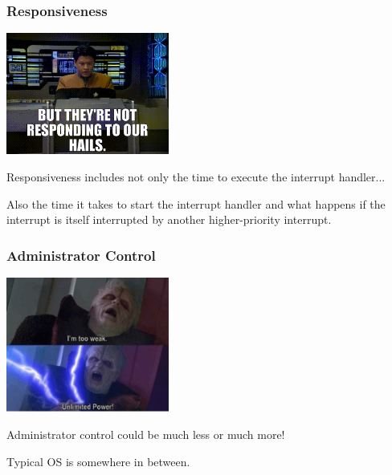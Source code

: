 \begin{frame}
\frametitle{Responsiveness}

\begin{center}
	\includegraphics[width=0.4\textwidth]{images/notresponding.jpg}
\end{center}

Responsiveness includes not only the time to execute the interrupt handler...

Also the time it takes to start the interrupt handler and what happens if the interrupt is itself interrupted by another higher-priority interrupt.

\end{frame}

\begin{frame}
\frametitle{Administrator Control}

\begin{center}
	\includegraphics[width=0.4\textwidth]{images/twup.png}
\end{center}

Administrator control could be much less or much more!

Typical OS is somewhere in between.

\end{frame}

